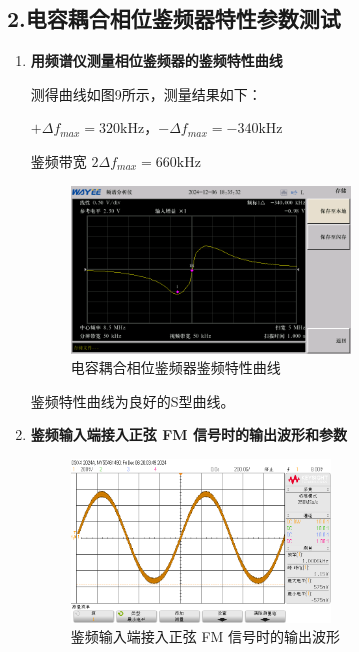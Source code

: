\documentclass[UTF8]{ctexart}
\begin{document}
\subsection*{2.电容耦合相位鉴频器特性参数测试}
\begin{enumerate}[(1)]
    \item \textbf{用频谱仪测量相位鉴频器的鉴频特性曲线}

    测得曲线如图9所示，测量结果如下：

    $+\Delta f_{max}=320\mathrm{kHz} $，$-\Delta f_{max}=-340\mathrm{kHz} $

    鉴频带宽 $2\Delta f_{max}=660\mathrm{kHz} $
    \begin{figure}[H]
        \centering
        
        \includegraphics[width=0.7\textwidth]{pics/20.png}
        \caption{电容耦合相位鉴频器鉴频特性曲线}\label{fig:20}
    \end{figure}

    鉴频特性曲线为良好的S型曲线。

    \item \textbf{鉴频输入端接入正弦 FM 信号时的输出波形和参数}

    \begin{figure}[H]
        \centering
        
        \includegraphics[width=0.65\textwidth]{pics/21.png}
        \caption{鉴频输入端接入正弦 FM 信号时的输出波形}\label{fig:21}
    \end{figure}


\end{enumerate}
\end{document}
